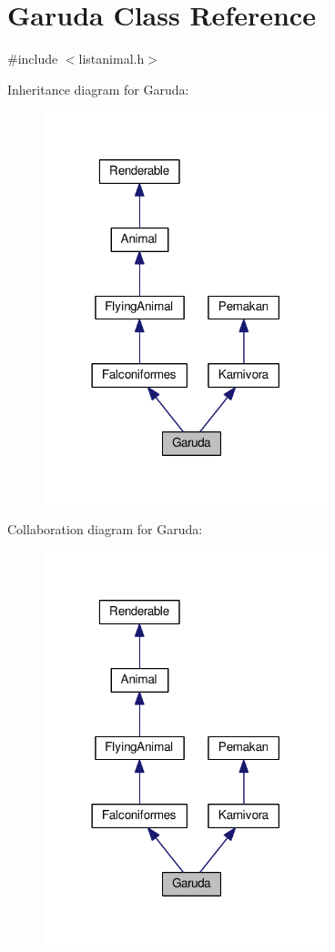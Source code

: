 \hypertarget{classGaruda}{}\section{Garuda Class Reference}
\label{classGaruda}


{\ttfamily \#include $<$listanimal.\+h$>$}



Inheritance diagram for Garuda\+:
\nopagebreak
\begin{figure}[H]
\begin{center}
\leavevmode
\includegraphics[width=234pt]{classGaruda__inherit__graph}
\end{center}
\end{figure}


Collaboration diagram for Garuda\+:
\nopagebreak
\begin{figure}[H]
\begin{center}
\leavevmode
\includegraphics[width=234pt]{classGaruda__coll__graph}
\end{center}
\end{figure}
